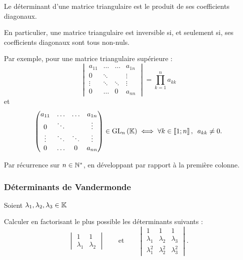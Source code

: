 \begin{prop}
Le déterminant d'une matrice triangulaire est le produit de ses coefficients diagonaux.

En particulier, une matrice triangulaire est inversible si, et seulement si, ses coefficients diagonaux sont tous non-nuls.

Par exemple, pour une matrice triangulaire supérieure : \[\begin{vmatrix}
a_{11} & \dots & \dots & a_{1n} \\
0 & \ddots &  & \vdots \\
\vdots & \ddots & \ddots & \vdots \\
0 & \dots & 0 & a_{nn}
\end{vmatrix}=\prod_{k=1}^na_{kk}\] et \[\begin{pmatrix}
a_{11} & \dots & \dots & a_{1n} \\
0 & \ddots &  & \vdots \\
\vdots & \ddots & \ddots & \vdots \\
0 & \dots & 0 & a_{nn}
\end{pmatrix}\in\GL{n}\ssi\quantifs{\forall k\in\interventierii{1}{n}}a_{kk}\not=0.\]
\end{prop}

\begin{dem}
Par récurrence sur \(n\in\mathbb{N}^*\), en développant par rapport à la première colonne.
\end{dem}

\subsubsection{Déterminants de Vandermonde}

\begin{exoex}
Soient \(\lambda_1,\lambda_2,\lambda_3\in\mathbb{K}\)

Calculer en factorisant le plus possible les déterminants suivants : \[\begin{vmatrix}
1 & 1 \\
\lambda_1 & \lambda_2
\end{vmatrix}\qquad\text{et}\qquad\begin{vmatrix}
1 & 1 & 1 \\
\lambda_1 & \lambda_2 & \lambda_3 \\
\lambda_1^2 & \lambda_2^2 & \lambda_3^2
\end{vmatrix}.\]
\end{exoex}

